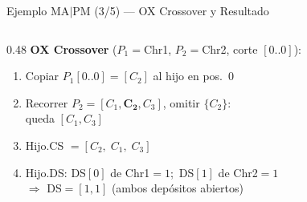\documentclass[aspectratio=169,10pt]{beamer}
\begin{document}
\begin{frame}{Ejemplo MA$|$PM (3/5) --- OX Crossover y Resultado}
  \begin{columns}[T,onlytextwidth]
    \begin{column}{0.48\textwidth}
      \textbf{OX Crossover} ($P_1{=}$Chr1, $P_2{=}$Chr2, corte $[0..0]$):
      \vspace{0.3em}
      \begin{enumerate}\small
        \item Copiar $P_1[0..0]{=}[C_2]$ al hijo en pos.\ 0
        \item Recorrer $P_2{=}[C_1,\mathbf{C_2},C_3]$, omitir $\{C_2\}$:\\
              queda $[C_1, C_3]$
        \item Hijo.CS $= [C_2,\; C_1,\; C_3]$
        \item Hijo.DS: DS$[0]$ de Chr1$=1$;\ DS$[1]$ de Chr2$=1$\\
              $\Rightarrow$ DS$=[1,1]$ (ambos depósitos abiertos)
      \end{enumerate}


\end{column}
\end{columns}
\end{frame}
\end{document}
